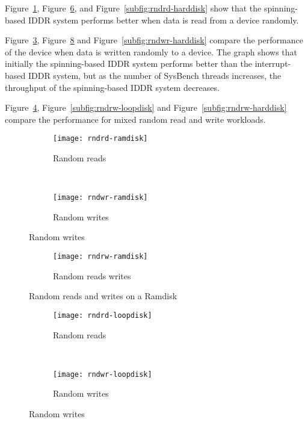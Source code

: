 Figure~\ref{subfig:rndrd-ramdisk}, Figure~\ref{subfig:rndrd-loopdisk},
and Figure~\ref{subfig:rndrd-harddisk} show that the spinning-based IDDR
system performs better when data is read from a device randomly.

Figure~\ref{subfig:rndwr-ramdisk}, Figure~\ref{subfig:rndwr-loopdisk}
and Figure~\ref{subfig:rndwr-harddisk} compare the performance of
the device when data is written randomly to a device. The graph shows
that initially the spinning-based IDDR system performs better than the
interrupt-based IDDR system, but as the number of SysBench threads increases,
the throughput of the spinning-based IDDR system decreases.

Figure~\ref{subfig:rndrw-ramdisk}, Figure~\ref{subfig:rndrw-loopdisk}
and Figure~\ref{subfig:rndrw-harddisk} compare the performance for mixed
random read and write workloads.

\begin{figure}[!ht]
 \centering
  \begin{subfigure}[b]{\textwidth}
  \texttt{[image: rndrd-ramdisk]}
  \caption{Random reads}
  \label{subfig:rndrd-ramdisk}
  \end{subfigure}\\
  \begin{subfigure}[b]{\textwidth}
  \texttt{[image: rndwr-ramdisk]}
  \caption{Random writes}
  \label{subfig:rndwr-ramdisk}
  \end{subfigure}
\end{figure}

\begin{figure}[H]
  \ContinuedFloat
  \begin{subfigure}[b]{\textwidth}
  \texttt{[image: rndrw-ramdisk]}
  \caption{Random reads writes}
  \label{subfig:rndrw-ramdisk}
  \end{subfigure}
  \caption{Random reads and writes on a Ramdisk}\label{fig:rndramdisk}
\end{figure}

\begin{figure}[!ht]
\centering
  \begin{subfigure}[b]{\textwidth}
  \texttt{[image: rndrd-loopdisk]}
  \caption{Random reads}
  \label{subfig:rndrd-loopdisk}
  \end{subfigure}\\
  \begin{subfigure}[b]{\textwidth}
  \texttt{[image: rndwr-loopdisk]}
  \caption{Random writes}
  \label{subfig:rndwr-loopdisk}
  \end{subfigure}
\end{figure}


